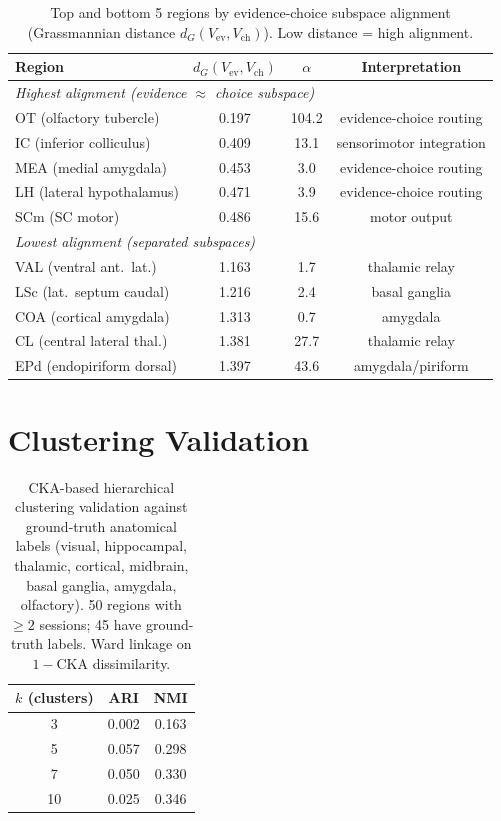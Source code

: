 \documentclass{article}
\begin{document}
\begin{table}[h]
\centering
\small
\caption{Top and bottom 5 regions by evidence-choice subspace alignment (Grassmannian distance $d_G(V_{\text{ev}}, V_{\text{ch}})$). Low distance = high alignment.}
\label{tab:routing}
\begin{tabular}{@{}lccc@{}}
\toprule
\textbf{Region} & \textbf{$d_G(V_{\text{ev}}, V_{\text{ch}})$} & \textbf{$\alpha$} & \textbf{Interpretation} \\
\midrule
\multicolumn{4}{l}{\emph{Highest alignment (evidence $\approx$ choice subspace)}} \\
OT (olfactory tubercle) & 0.197 & 104.2 & evidence-choice routing \\
IC (inferior colliculus) & 0.409 & 13.1 & sensorimotor integration \\
MEA (medial amygdala) & 0.453 & 3.0 & evidence-choice routing \\
LH (lateral hypothalamus) & 0.471 & 3.9 & evidence-choice routing \\
SCm (SC motor) & 0.486 & 15.6 & motor output \\
\midrule
\multicolumn{4}{l}{\emph{Lowest alignment (separated subspaces)}} \\
VAL (ventral ant.\ lat.) & 1.163 & 1.7 & thalamic relay \\
LSc (lat.\ septum caudal) & 1.216 & 2.4 & basal ganglia \\
COA (cortical amygdala) & 1.313 & 0.7 & amygdala \\
CL (central lateral thal.) & 1.381 & 27.7 & thalamic relay \\
EPd (endopiriform dorsal) & 1.397 & 43.6 & amygdala/piriform \\
\bottomrule
\end{tabular}
\end{table}

\section{Clustering Validation}
\label{app:clustering}

\begin{table}[h]
\centering
\small
\caption{CKA-based hierarchical clustering validation against ground-truth anatomical labels (visual, hippocampal, thalamic, cortical, midbrain, basal ganglia, amygdala, olfactory). 50 regions with $\geq 2$ sessions; 45 have ground-truth labels. Ward linkage on $1 - \text{CKA}$ dissimilarity.}
\label{tab:clustering}
\begin{tabular}{@{}ccc@{}}
\toprule
\textbf{$k$ (clusters)} & \textbf{ARI} & \textbf{NMI} \\
\midrule
3 & 0.002 & 0.163 \\
5 & 0.057 & 0.298 \\
7 & 0.050 & 0.330 \\
10 & 0.025 & 0.346 \\
\bottomrule
\end{tabular}
\end{table}
\end{document}
